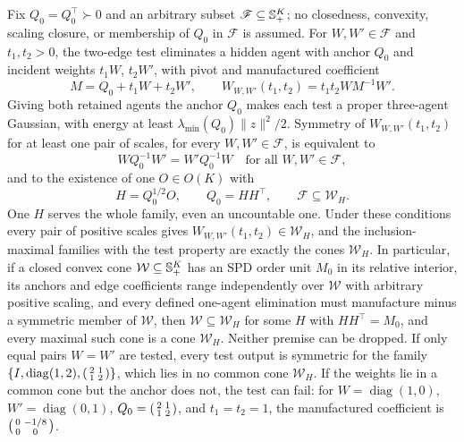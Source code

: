 Fix \(Q_0=Q_0^\top\succ0\) and an arbitrary subset
\(\mathscr F\subseteq\mathbb S_{+}^K\); no closedness, convexity, scaling closure, or
membership of \(Q_0\) in \(\mathscr F\) is assumed. For
\(W,W'\in\mathscr F\) and \(t_1,t_2>0\), the two-edge test eliminates a hidden
agent with anchor \(Q_0\) and incident weights \(t_1W\), \(t_2W'\), with pivot
and manufactured coefficient
\begin{equation}
M=Q_0+t_1W+t_2W',\qquad
W_{W,W'}(t_1,t_2)=t_1t_2WM^{-1}W'.
\label{eq:cg-independent-pair-test}
\end{equation}
Giving both retained agents the anchor \(Q_0\) makes each test a proper
three-agent Gaussian, with energy at least \(\lambda_{\min}(Q_0)\|z\|^2/2\).
Symmetry of \(W_{W,W'}(t_1,t_2)\) for at least one pair of scales, for every
\(W,W'\in\mathscr F\), is equivalent to
\begin{equation}
WQ_0^{-1}W'=W'Q_0^{-1}W
\quad\text{for all }W,W'\in\mathscr F,
\label{eq:cg-anchor-commutation}
\end{equation}
and to the existence of one \(O\in O(K)\) with
\begin{equation}
H=Q_0^{1/2}O,\qquad Q_0=HH^\top,\qquad
\mathscr F\subseteq\mathcal W_H .
\label{eq:cg-anchored-common-cone}
\end{equation}
One \(H\) serves the whole family, even an uncountable one. Under these
conditions every pair of positive scales gives
\(W_{W,W'}(t_1,t_2)\in\mathcal W_H\), and the inclusion-maximal families with
the test property are exactly the cones \(\mathcal W_H\). In particular, if a
closed convex cone \(\mathcal W\subseteq\mathbb S_{+}^K\) has an SPD order unit \(M_0\)
in its relative interior, its anchors and edge coefficients range independently
over \(\mathcal W\) with arbitrary positive scaling, and every defined one-agent
elimination must manufacture minus a symmetric member of \(\mathcal W\), then
\(\mathcal W\subseteq\mathcal W_H\) for some \(H\) with \(HH^\top=M_0\), and
every maximal such cone is a cone \(\mathcal W_H\). Neither premise can be
dropped. If only equal pairs \(W=W'\) are tested, every test output is
symmetric for the family
\(\{I,\operatorname{diag}(1,2),\begin{psmallmatrix}2&1\\1&2\end{psmallmatrix}\}\),
which lies in no common cone \(\mathcal W_H\). If the weights lie in a common
cone but the anchor does not, the test can fail: for
\(W=\operatorname{diag}(1,0)\), \(W'=\operatorname{diag}(0,1)\),
\(Q_0=\begin{psmallmatrix}2&1\\1&2\end{psmallmatrix}\), and \(t_1=t_2=1\), the
manufactured coefficient is
\(\begin{psmallmatrix}0&-1/8\\0&0\end{psmallmatrix}\). 

